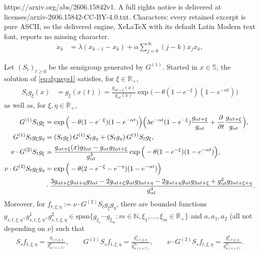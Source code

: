\documentclass[10pt,a4paper]{amsart}
\begin{document}
https://arxiv.org/abs/2606.15842v1. A full rights notice is delivered at licenses/arxiv-2606.15842-CC-BY-4.0.txt. Characters: every retained excerpt is pure ASCII, so the delivered engine, XeLaTeX with its default Latin Modern text font, reports no missing character.
\begin{align}
  \label{eq:dynsys1}
  \dot x_k & = \lambda(x_{k-1}-x_k) + \alpha \sum_{j=0}^\infty (j - k) x_j x_k,
\end{align}

\begin{corollary}\label{cor2.4}
  Let $(S_t)_{t\geq 0}$ be the semigroup generated by $G^{(1)}$. Started in $x \in \mathbb S$, the solution of \eqref{eq:dynsys1} satisfies, for $\xi \in \mathbb R_+$, 
\begin{equation}
\label{eq:sol2}
\begin{aligned}
  S_t g_{\xi}(x) & = g_{\xi}(x(t)) = \frac{g_{\alpha t + \xi}(x)}{g_{\alpha t}(x)}
  \exp\Big(-\theta(1-e^{- \xi})(1-e^{-\alpha t})\Big)
\end{aligned}
\end{equation}
as well as, for $\xi, \eta \in \mathbb R_+$,
\begin{align}
    \label{eq:sol3}
    G^{(1)}S_t g_{\xi} & = \exp\Big(-\theta(1-e^{- \xi})(1-e^{-\alpha t})\Big)\Big(\lambda e^{-\alpha t}(1 - e^{-\xi})\frac{g_{\alpha  t + \xi}}{g_{\alpha t}} + \frac{\partial}{\partial t} \frac{g_{\alpha  t + \xi}}{g_{\alpha t}}\Big), \\ \label{eq:sol32}
    G^{(1)}S_t g_{\xi} g_{\eta} & = (S_t g_{\xi})\, G^{(1)}S_t g_{\eta} + (S_t g_{ \eta})\, G^{(1)}S_t g_{ \xi}, \\ 
    \label{eq:sol4}
    \nu \cdot G^{(2)}S_t g_{ \xi} & = 
    \frac{g_{\alpha  t + \xi}(x)g_{2\alpha t} - g_{\alpha t} g_{2\alpha t+\xi}}{g_{\alpha t}^3}\exp\Big(-\theta(1-e^{-\xi})(1-e^{-\alpha t})\Big), \\
    \nu \cdot G^{(2)}S_t g_{\xi} g_{\eta}  & = \exp\Big(-\theta(2-e^{-\xi} - e^{- \eta})(1-e^{-\alpha t})\Big) \notag \\ 
    \label{eq:sol42} &  \cdot 
    \frac{
    3g_{\alpha t + \xi} g_{\alpha  t + \eta}g_{2\alpha t} - 2 g_{\alpha  t + \xi} g_{\alpha t}g_{2\alpha t + \eta} - 2 g_{\alpha t + \eta} g_{\alpha t} g_{2\alpha t+\xi} + g_{\alpha t}^2 g_{2\alpha t+\xi+\eta}}{g_{\alpha t}^4}. 
\end{align}
Moreover, for $f_{t,\xi,\eta} := \nu \cdot G^{(2)}S_t g_{\xi} g_{\eta}$, there are bounded functions $g_{s, t, \xi, \eta}, g^1_{s, t, \xi, \eta}, g^2_{s, t, \xi, \eta} \in \text{span} \{g_{\xi_1} \cdots g_{\xi_m}: m \in \mathbb N, \xi_1,...,\xi_m \in \mathbb R_+ \}$ and $a, a_1, a_2$ (all not depending on $\nu$) such that 
\begin{align}
    \label{eq:morebounds}
    S_s f_{t,\xi, \eta} = \frac{g_{s,t,\xi, \eta}}{g_{\alpha (s+t)}^{a}}, \qquad G^{(1)} S_s f_{t,\xi, \eta} = \frac{g^1_{s,t,\xi, \eta}}{g_{\alpha (s+t)}^{a_1}}, \qquad \nu \cdot G^{(2)} S_s f_{t,\xi, \eta} = \frac{g^2_{s,t,\xi, \eta}}{g_{\alpha (s+t)}^{a_2}}.
\end{align}
\end{corollary}
\end{document}
